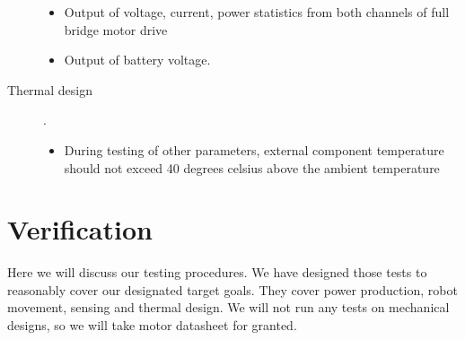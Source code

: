 \documentclass[12pt]{article}
\begin{document}
\begin{description}
\begin{itemize}
      \item Output of voltage, current, power statistics from both channels of full bridge motor drive
      \item Output of battery voltage.
      \end{itemize}
    \item[Thermal design]. 
    \begin{itemize}
      \item During testing of other parameters, external component temperature should not exceed 40 degrees celsius above the ambient temperature
      \end{itemize}
 \end{description}
 
 \section{Verification}
 Here we will discuss our testing procedures. We have designed those tests to reasonably cover our designated target goals. They cover power production, robot movement, sensing and thermal design. We will not run any tests on mechanical designs, so we will take motor datasheet for granted.
\end{document}
